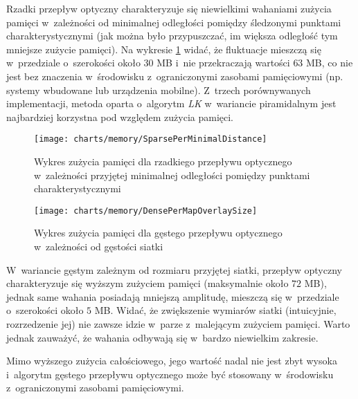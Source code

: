     Rzadki przepływ optyczny charakteryzuje się niewielkimi wahaniami zużycia pamięci w~zależności od minimalnej odległości pomiędzy śledzonymi punktami charakterystycznymi (jak można było przypuszczać, im większa odległość tym mniejsze zużycie pamięci). Na wykresie \ref{fig:SparseOpticalFlowPerMinimalDistanceBetweenPoints} widać, że fluktuacje mieszczą się w~przedziale o~szerokości około $30$ MB i~nie przekraczają wartości $63$ MB, co nie jest bez znaczenia w~środowisku z~ograniczonymi zasobami pamięciowymi (np. systemy wbudowane lub urządzenia mobilne). Z~trzech porównywanych implementacji, metoda oparta o~algorytm \textit{LK} w~wariancie piramidalnym jest najbardziej korzystna pod względem zużycia pamięci.

      \begin{figure}[!ht]
        \centering
        \texttt{[image: charts/memory/SparsePerMinimalDistance]}
        \caption[Wykres zużycia pamięci dla rzadkiego przepływu optycznego w~zależności przyjętej minimalnej odległości pomiędzy punktami charakterystycznymi]
                {Wykres zużycia pamięci dla rzadkiego przepływu optycznego w~zależności przyjętej minimalnej odległości pomiędzy punktami charakterystycznymi}
        \label{fig:SparseOpticalFlowPerMinimalDistanceBetweenPoints}
      \end{figure}

      \begin{figure}[!ht]
        \centering
        \texttt{[image: charts/memory/DensePerMapOverlaySize]}
        \caption[Wykres zużycia pamięci dla gęstego przepływu optycznego w~zależności od gęstości siatki]
                {Wykres zużycia pamięci dla gęstego przepływu optycznego w~zależności od gęstości siatki}
        \label{fig:DenseOpticalFlowPerMapSize}
      \end{figure}

    \newpage

    W~wariancie gęstym zależnym od rozmiaru przyjętej siatki, przepływ optyczny charakteryzuje się wyższym zużyciem pamięci (maksymalnie około $72$ MB), jednak same wahania posiadają mniejszą amplitudę, mieszczą się w~przedziale o~szerokości około $5$ MB. Widać, że zwiększenie wymiarów siatki (intuicyjnie, rozrzedzenie jej) nie zawsze idzie w~parze z~malejącym zużyciem pamięci. Warto jednak zauważyć, że wahania odbywają się w~bardzo niewielkim zakresie.

    Mimo wyższego zużycia całościowego, jego wartość nadal nie jest zbyt wysoka i~algorytm gęstego przepływu optycznego może być stosowany w~środowisku z~ograniczonymi zasobami pamięciowymi.


